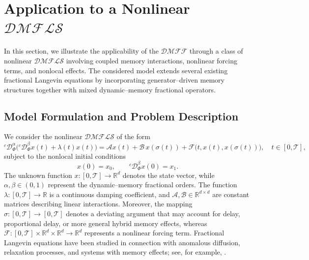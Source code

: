 \documentclass[11pt]{article}
\numberwithin{equation}{section}
\begin{document}



\section{Application to a Nonlinear $\mathcal{DMFLS}$}

In this section, we illustrate the applicability of the $\mathcal{DMFF}$ through a class of nonlinear $\mathcal{DMFLS}$ involving coupled memory interactions, nonlinear forcing terms, and nonlocal effects. The considered model extends several existing fractional Langevin equations by incorporating generator--driven memory structures together with mixed dynamic--memory fractional operators.

\subsection{Model Formulation and Problem Description}

We consider the nonlinear $\mathcal{DMFLS}$ of the form
\begin{equation}\label{MainSystem}
{}^{c}\mathcal D_{\Phi}^{\alpha}
\Big(
{}^{c}\mathcal D_{\Phi}^{\beta}x(t)
+
\lambda(t)x(t)
\Big)
=
\mathcal{A} x(t)
+
\mathcal{B}\,x(\sigma(t))
+
\mathcal{F}\big(t,x(t),x(\sigma(t))\big),
\quad t\in[0,\mathcal{T}],
\end{equation}
subject to the nonlocal initial conditions
\begin{equation}\label{IC}
x(0)=x_{0},
\qquad
{}^{c}\mathcal D_{\Phi}^{\beta}x(0)=x_{1}.
\end{equation}
The unknown function
\(
x:[0,\mathcal{T}]\to\mathbb R^{d}
\)
denotes the state vector, while
\(
\alpha,\beta\in(0,1)
\)
represent the dynamic--memory fractional orders. The function
\(
\lambda:[0,\mathcal{T}]\to\mathbb R
\)
is a continuous damping coefficient, and
\(
\mathcal{A},\mathcal{B}\in\mathbb R^{d\times d}
\)
are constant matrices describing linear interactions. Moreover, the mapping
\(
\sigma:[0,\mathcal{T}]\to[0,\mathcal{T}]
\)
denotes a deviating argument that may account for delay, proportional delay,
or more general hybrid memory effects, whereas
\(
\mathcal{F}:[0,\mathcal{T}]\times\mathbb R^{d}\times\mathbb R^{d}\to\mathbb R^{d}
\)
represents a nonlinear forcing term. Fractional Langevin equations have been studied in connection with anomalous diffusion, relaxation processes, and systems with memory effects; see, for example, \cite{Lutz2001,Alzabut2020}.
\end{document}
